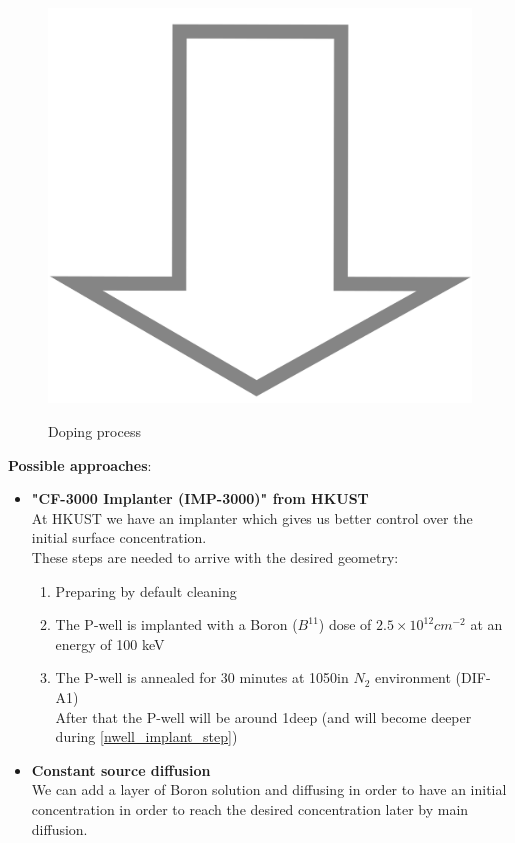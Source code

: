 \begin{figure}[H]
	\includegraphics[scale=0.01]{down_arrow.png} \\
	\begin{tikzpicture}[node distance = 3cm, auto, thick,scale=\CrossSectionOnly, every node/.style={transform shape}]
		
	\end{tikzpicture}
	\caption{Doping process}
\end{figure}

\textbf{Possible approaches}:
\begin{itemize}
	\item \textbf{"CF-3000 Implanter (IMP-3000)" from HKUST} \\
	At HKUST we have an implanter which gives us better control over the initial surface concentration. \\
	These steps are needed to arrive with the desired geometry:
	\begin{enumerate}
		\item Preparing by default cleaning
		\item The P-well is implanted with a Boron ($B^{11}$) dose of $2.5\times10^{12}cm^{-2}$ at an energy of 100 keV
		\item The P-well is annealed for 30 minutes at 1050\degreesC in $N_2$ environment (DIF-A1)\\
		After that the P-well will be around 1\um deep (and will become deeper during \autoref{nwell_implant_step})
	\end{enumerate}
	\item \textbf{Constant source diffusion} \\
	We can add a layer of Boron solution and diffusing in order to have an initial concentration in order to reach the desired concentration later by main diffusion.
\end{itemize}

